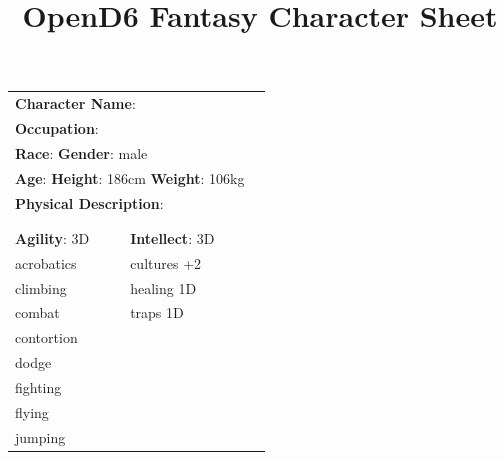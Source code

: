 \documentclass[10pt]{article}
\title{OpenD6 Fantasy Character Sheet}
\begin{document}
\pagestyle{fancy}
\fancyhf{}
\fancyfoot[R]{\thepage}
\renewcommand{\headrulewidth}{0pt}


\cleardoublepage
\begin{table}
\begin{tabular}{m{156pt} m{156pt} m{156pt}}
    \multicolumn{2}{l}{\textbf{Character Name}:  \hrulefill} \\
    \multicolumn{2}{l}{\textbf{Occupation}:  \hrulefill} \\
    \multicolumn{2}{l}{\textbf{Race}:  \hrulefill \hspace{1em} \textbf{Gender}: male \hrulefill} \\
    \multicolumn{2}{l}{\textbf{Age}:  \hrulefill \hspace{1em} \textbf{Height}: 186cm \hrulefill \hspace{1em}  \textbf{Weight}: 106kg \hrulefill } \\
    \multicolumn{2}{l}{\textbf{Physical Description}:  \hrulefill } \\
    \multicolumn{2}{l}{ \hrulefill } \\
 & & \\
\textbf{Agility}: 3D \hrulefill      & \textbf{Intellect}: 3D \hrulefill  &                             \\

acrobatics           \hrulefill & cultures          +2 \hrulefill & \\

climbing             \hrulefill & healing           1D \hrulefill & \\

combat               \hrulefill & traps             1D \hrulefill & \\

contortion           \hrulefill &  \hrulefill & \\

dodge                \hrulefill &  \hrulefill & \\

fighting             \hrulefill &  \hrulefill & \\

flying               \hrulefill &  \hrulefill & \\

jumping              \hrulefill &  \hrulefill & \\


\end{tabular}
\end{table}
\end{document}
